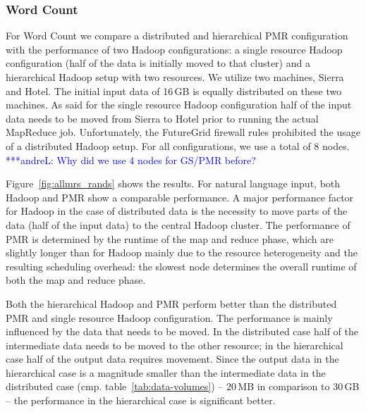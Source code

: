 \documentclass{acm_proc_article-sp}
\newcommand{\alnote}[1]{ {\textcolor{blue} { ***andreL: #1 }}}
\newcommand{\alnote}[1]{}
\begin{document}
\subsubsection*{Word Count}

For Word Count we compare a distributed and hierarchical PMR configuration with
the performance of two Hadoop configurations: a single resource Hadoop
configuration (half of the data is initially moved to that cluster) and a
hierarchical Hadoop setup with two resources. We utilize two machines, Sierra
and Hotel. The initial input data of 16\,GB is equally distributed on these two
machines. As said for the single resource Hadoop configuration half of the input
data needs to be moved from Sierra to Hotel prior to running the actual
MapReduce job. Unfortunately, the FutureGrid firewall rules prohibited the usage
of a distributed Hadoop setup. For all configurations, we use a total of 8
nodes.\alnote{Why did we use 4 nodes for GS/PMR before?}

Figure~\ref{fig:allmrs_rands} shows the results. For natural language input,
both Hadoop and PMR show a comparable performance. A major performance factor
for Hadoop in the case of distributed data is the necessity to move parts of the
data (half of the input data) to the central Hadoop cluster. The performance of
PMR is determined by the runtime of the map and reduce phase, which are slightly
longer than for Hadoop mainly due to the resource heterogeneity and the
resulting scheduling overhead: the slowest node determines the overall runtime
of both the map and reduce phase.


Both the hierarchical Hadoop and PMR perform better than the
distributed PMR and single resource Hadoop configuration. The performance is
mainly influenced by the data that needs to be moved. In the distributed case
half of the intermediate data needs to be moved to the other resource; in the
hierarchical case half of the output data requires movement. Since the output
data in the hierarchical case is a magnitude smaller than the intermediate data
in the distributed case (cmp. table~\ref{tab:data-volumes}) -- 20\,MB in
comparison to 30\,GB -- the performance in the hierarchical case is
significant better.

\end{document}
